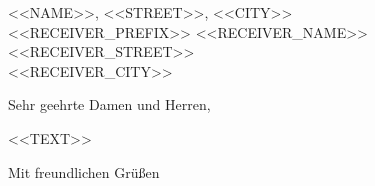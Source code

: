 \documentclass[11pt,a4paper]{dinbrief}
\begin{document}
\begin{letter}{\tiny{<<NAME>>, <<STREET>>, <<CITY>>}\\ 
<<RECEIVER_PREFIX>>
<<RECEIVER_NAME>>\\
<<RECEIVER_STREET>>\\
<<RECEIVER_CITY>>\\[6pt]
}

\subject{<<BETREFF>>}

\opening{Sehr geehrte Damen und Herren,}

<<TEXT>>

\closing{Mit freundlichen Grüßen}

\end{letter}
\end{document}
